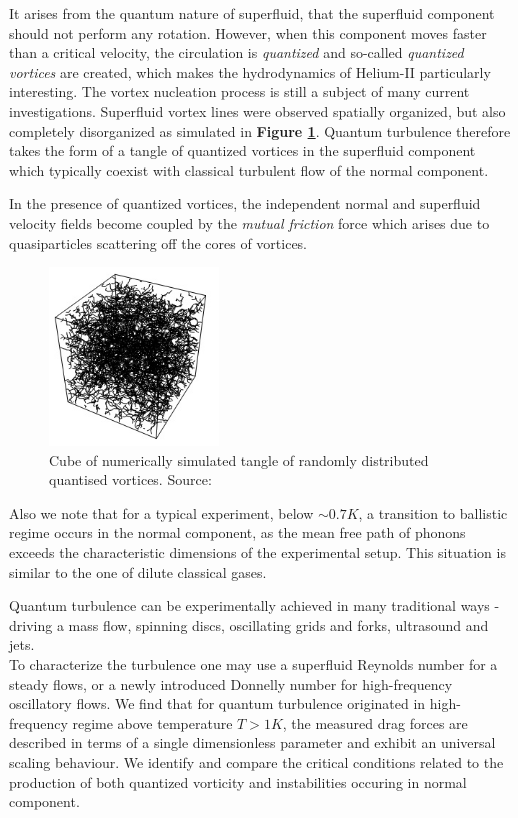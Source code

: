 	It arises from the quantum nature of superfluid, that the superfluid component should not perform any rotation. However, when this component moves faster than a critical velocity, the circulation is \textit{quantized} and so-called \textit{quantized vortices} are created, which makes the hydrodynamics of Helium-II particularly interesting. The vortex nucleation process is still a subject of many current investigations. Superfluid vortex lines were observed spatially organized, but also completely disorganized as simulated in \textbf{Figure \ref{sim_cube}}. Quantum turbulence therefore takes the form of a tangle of quantized vortices in the superfluid component which typically coexist with classical turbulent flow of the normal component.

	In the presence of quantized vortices, the independent normal and superfluid velocity fields become coupled by the \textit{mutual friction} force which arises due to quasiparticles scattering off the cores of vortices.

	\begin{figure}[h]
		\centering
		\includegraphics[width=0.4\textwidth]{graphics/theory/QT-tangle}
		\caption{Cube of numerically simulated tangle of randomly distributed quantised vortices. Source: \cite{svoc2016}}
		\label{sim_cube}
	\end{figure}

	Also we note that for a typical experiment, below $\sim 0.7\unit{K}$, a transition to ballistic regime occurs in the normal component, as the mean free path of phonons exceeds the characteristic dimensions of the experimental setup. This situation is similar to the one of dilute classical gases.

	Quantum turbulence can be experimentally achieved in many traditional ways - driving a mass flow, spinning discs, oscillating grids and forks, ultrasound and jets.\\
	To characterize the turbulence one may use a superfluid Reynolds number for a steady flows, or a newly introduced \cite{universal_scaling} Donnelly number for high-frequency oscillatory flows.
	We find that for quantum turbulence originated in high-frequency regime above temperature $T > 1\unit{K}$, the measured drag forces are described in terms of a single dimensionless parameter and exhibit an universal scaling behaviour. We identify and compare the critical conditions related to the production of both quantized vorticity and instabilities occuring in normal component.


